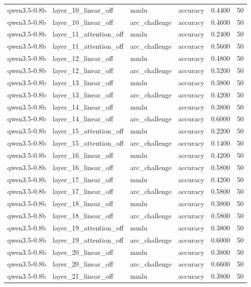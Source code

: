 \begin{tabular}{llllrr}
qwen3.5-0.8b & layer_10_linear_off & mmlu & accuracy & 0.4400 & 50 \\
qwen3.5-0.8b & layer_10_linear_off & arc_challenge & accuracy & 0.4600 & 50 \\
qwen3.5-0.8b & layer_11_attention_off & mmlu & accuracy & 0.2400 & 50 \\
qwen3.5-0.8b & layer_11_attention_off & arc_challenge & accuracy & 0.5600 & 50 \\
qwen3.5-0.8b & layer_12_linear_off & mmlu & accuracy & 0.4800 & 50 \\
qwen3.5-0.8b & layer_12_linear_off & arc_challenge & accuracy & 0.5200 & 50 \\
qwen3.5-0.8b & layer_13_linear_off & mmlu & accuracy & 0.3800 & 50 \\
qwen3.5-0.8b & layer_13_linear_off & arc_challenge & accuracy & 0.4200 & 50 \\
qwen3.5-0.8b & layer_14_linear_off & mmlu & accuracy & 0.3800 & 50 \\
qwen3.5-0.8b & layer_14_linear_off & arc_challenge & accuracy & 0.6000 & 50 \\
qwen3.5-0.8b & layer_15_attention_off & mmlu & accuracy & 0.2200 & 50 \\
qwen3.5-0.8b & layer_15_attention_off & arc_challenge & accuracy & 0.1400 & 50 \\
qwen3.5-0.8b & layer_16_linear_off & mmlu & accuracy & 0.4200 & 50 \\
qwen3.5-0.8b & layer_16_linear_off & arc_challenge & accuracy & 0.5800 & 50 \\
qwen3.5-0.8b & layer_17_linear_off & mmlu & accuracy & 0.4200 & 50 \\
qwen3.5-0.8b & layer_17_linear_off & arc_challenge & accuracy & 0.5800 & 50 \\
qwen3.5-0.8b & layer_18_linear_off & mmlu & accuracy & 0.3800 & 50 \\
qwen3.5-0.8b & layer_18_linear_off & arc_challenge & accuracy & 0.5800 & 50 \\
qwen3.5-0.8b & layer_19_attention_off & mmlu & accuracy & 0.3800 & 50 \\
qwen3.5-0.8b & layer_19_attention_off & arc_challenge & accuracy & 0.6000 & 50 \\
qwen3.5-0.8b & layer_20_linear_off & mmlu & accuracy & 0.3800 & 50 \\
qwen3.5-0.8b & layer_20_linear_off & arc_challenge & accuracy & 0.6600 & 50 \\
qwen3.5-0.8b & layer_21_linear_off & mmlu & accuracy & 0.3800 & 50 \\

\end{tabular}

